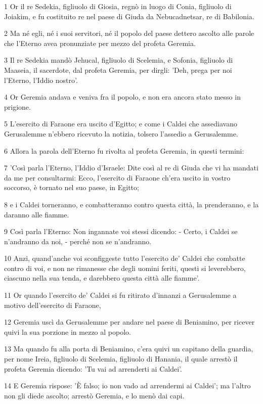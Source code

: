 \par 1 Or il re Sedekia, figliuolo di Giosia, regnò in luogo di Conia, figliuolo di Joiakim, e fu costituito re nel paese di Giuda da Nebucadnetsar, re di Babilonia.
\par 2 Ma né egli, né i suoi servitori, né il popolo del paese dettero ascolto alle parole che l'Eterno avea pronunziate per mezzo del profeta Geremia.
\par 3 Il re Sedekia mandò Jehucal, figliuolo di Scelemia, e Sofonia, figliuolo di Maaseia, il sacerdote, dal profeta Geremia, per dirgli: 'Deh, prega per noi l'Eterno, l'Iddio nostro'.
\par 4 Or Geremia andava e veniva fra il popolo, e non era ancora stato messo in prigione.
\par 5 L'esercito di Faraone era uscito d'Egitto; e come i Caldei che assediavano Gerusalemme n'ebbero ricevuto la notizia, tolsero l'assedio a Gerusalemme.
\par 6 Allora la parola dell'Eterno fu rivolta al profeta Geremia, in questi termini:
\par 7 'Così parla l'Eterno, l'Iddio d'Israele: Dite così al re di Giuda che vi ha mandati da me per consultarmi: Ecco, l'esercito di Faraone ch'era uscito in vostro soccorso, è tornato nel suo paese, in Egitto;
\par 8 e i Caldei torneranno, e combatteranno contro questa città, la prenderanno, e la daranno alle fiamme.
\par 9 Così parla l'Eterno: Non ingannate voi stessi dicendo: - Certo, i Caldei se n'andranno da noi, - perché non se n'andranno.
\par 10 Anzi, quand'anche voi sconfiggeste tutto l'esercito de' Caldei che combatte contro di voi, e non ne rimanesse che degli uomini feriti, questi si leverebbero, ciascuno nella sua tenda, e darebbero questa città alle fiamme'.
\par 11 Or quando l'esercito de' Caldei si fu ritirato d'innanzi a Gerusalemme a motivo dell'esercito di Faraone,
\par 12 Geremia uscì da Gerusalemme per andare nel paese di Beniamino, per ricever quivi la sua porzione in mezzo al popolo.
\par 13 Ma quando fu alla porta di Beniamino, c'era quivi un capitano della guardia, per nome Ireia, figliuolo di Scelemia, figliuolo di Hanania, il quale arrestò il profeta Geremia dicendo: 'Tu vai ad arrenderti ai Caldei'.
\par 14 E Geremia rispose: 'È falso; io non vado ad arrendermi ai Caldei'; ma l'altro non gli diede ascolto; arrestò Geremia, e lo menò dai capi.
